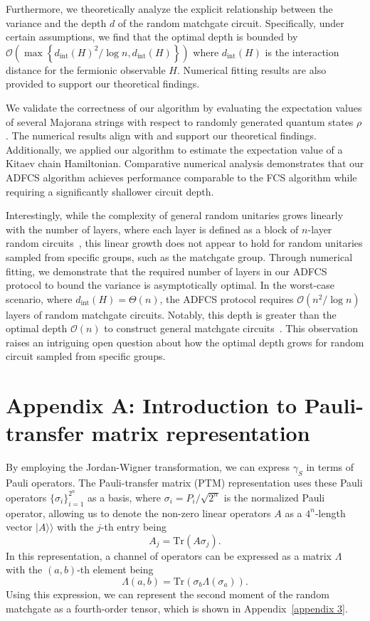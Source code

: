 \documentclass[journal=jctcce,a4paper,manuscript=article]{achemso}
\newcommand{\supket}[1]{|#1 \rangle\rangle}
\newcommand{\cbra}[1]{\{ #1 \}}
\newcommand{\Ord}[1]{\mathcal{O}\left( #1 \right)}
\begin{document}
Furthermore, we theoretically analyze the explicit relationship between the
variance and the depth $d$ of the random matchgate circuit. Specifically, under
certain assumptions, we find that the optimal depth is {bounded by}
$\Ord{\max\left\{{d_{\text{int}}(H)^2}/{\log n}, d_{\text{int}}(H)\right\}}$
where $d_{\text{int}}(H)$ is the interaction distance for the fermionic
observable $H$. Numerical fitting results are also provided to support our
theoretical findings.

We validate the correctness of our algorithm by evaluating the expectation
values of several Majorana strings with respect to randomly generated quantum
states $\rho$. The numerical results align with and support our theoretical
findings. Additionally, we applied our algorithm to estimate the expectation
value of a Kitaev chain Hamiltonian. Comparative numerical analysis
demonstrates that our ADFCS algorithm achieves performance comparable to the
FCS algorithm while requiring a significantly shallower circuit depth.

  {Interestingly, while the complexity of general random unitaries grows linearly with the number of layers, where each layer is defined as a block of $n$-layer random circuits~\cite{haferkamp2022linear}, this linear growth does not appear to hold for random unitaries sampled from specific groups, such as the matchgate group.
    Through numerical fitting, we demonstrate that the required number of layers in our ADFCS protocol to bound the variance is asymptotically optimal. In the worst-case scenario, where $d_{\text{int}}(H) = \Theta(n)$, the ADFCS protocol requires $\Ord{n^2 / \log n}$ layers of random matchgate circuits. Notably, this depth is greater than the optimal depth $\Ord{n}$ to construct general matchgate circuits~\cite{jiang2018quantum}.
    This observation raises an intriguing open question about how the optimal depth grows for random circuit sampled from specific groups.}

\section{Appendix A: Introduction to Pauli-transfer matrix representation}
\label{appendix: intro_superoperator}

By employing the Jordan-Wigner transformation, we can express $\gamma_S$ in
terms of Pauli operators. The Pauli-transfer matrix (PTM) representation uses
these Pauli operators $\cbra{\sigma_i}_{i=1}^{2^n}$ as a basis, where $\sigma_i
  =P_i/\sqrt{2^n}$ is the normalized Pauli operator, allowing us to denote the
non-zero linear operators $A$ as a $4^n$-length vector $\supket{A}$ with the
$j$-th entry being
\begin{equation}
  A_j = \text{Tr}(A \sigma_j).
\end{equation}
In this representation, a channel of operators can be expressed as a matrix $\Lambda$ with the $(a,b)$-th element being
\begin{equation}
  \Lambda(a,b) = \text{Tr}(\sigma_b \Lambda(\sigma_a)).
\end{equation}
Using this expression, we can represent the second moment of the random matchgate as a fourth-order tensor, which is shown in Appendix~\ref{appendix 3}.
\end{document}

